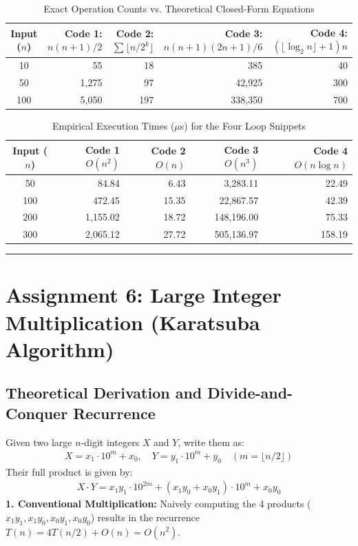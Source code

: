 \documentclass[12pt]{article}
\begin{document}
\begin{table}[H]
\centering
\caption{Exact Operation Counts vs. Theoretical Closed-Form Equations}
\vspace{4pt}
\begin{tabular}{crrrr}
\toprule
\textbf{Input ($n$)} & \textbf{Code 1: $n(n+1)/2$} & \textbf{Code 2: $\sum \lfloor n/2^k \rfloor$} & \textbf{Code 3: $n(n+1)(2n+1)/6$} & \textbf{Code 4: $(\lfloor\log_2 n\rfloor + 1)n$} \\
\midrule
10  & 55      & 18  & 385     & 40 \\
50  & 1,275   & 97  & 42,925  & 300 \\
100 & 5,050   & 197 & 338,350 & 700 \\
\bottomrule
\end{tabular}
\end{table}

\begin{table}[H]
\centering
\caption{Empirical Execution Times ($\mu$s) for the Four Loop Snippets}
\vspace{4pt}
\begin{tabular}{crrrr}
\toprule
\textbf{Input ($n$)} & \textbf{Code 1 $O(n^2)$} & \textbf{Code 2 $O(n)$} & \textbf{Code 3 $O(n^3)$} & \textbf{Code 4 $O(n \log n)$} \\
\midrule
50  & 84.84    & 6.43  & 3,283.11   & 22.49 \\
100 & 472.45   & 15.35 & 22,867.57  & 42.39 \\
200 & 1,155.02 & 18.72 & 148,196.00 & 75.33 \\
300 & 2,065.12 & 27.72 & 505,136.97 & 158.19 \\
\bottomrule
\end{tabular}
\end{table}

\vspace{0.3cm}
\hrule
\vspace{0.3cm}

\section{Assignment 6: Large Integer Multiplication (Karatsuba Algorithm)}

\subsection{Theoretical Derivation and Divide-and-Conquer Recurrence}
Given two large $n$-digit integers $X$ and $Y$, write them as:
\begin{align*}
    X = x_1 \cdot 10^m + x_0, \quad Y = y_1 \cdot 10^m + y_0 \quad \left(m = \lfloor n/2 \rfloor\right)
\end{align*}
Their full product is given by:
\begin{align*}
    X \cdot Y = x_1 y_1 \cdot 10^{2m} + (x_1 y_0 + x_0 y_1) \cdot 10^m + x_0 y_0
\end{align*}
\textbf{1. Conventional Multiplication:} Naively computing the 4 products ($x_1 y_1, x_1 y_0, x_0 y_1, x_0 y_0$) results in the recurrence $T(n) = 4T(n/2) + O(n) = O(n^2)$.
\end{document}
